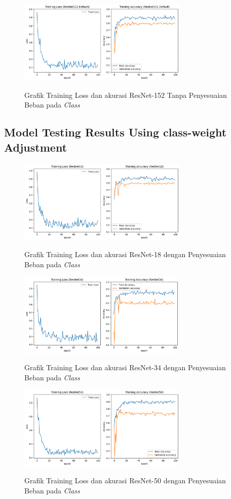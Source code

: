 \begin{figure}[hbtp]
	{\includegraphics[height=4cm]{gambar/TrainingGraphResNet152.png}}
	\caption{Grafik Training Loss dan akurasi ResNet-152 Tanpa Penyesuaian Beban pada \emph{Class}}
	\label{Fig:GraphTrainingDefPt5}
\end{figure}

\subsection{Model Testing Results Using class-weight Adjustment}
\label{sec:412}
\begin{figure}[hbtp]
	\centering
	{\includegraphics[height=4cm]{gambar/TrainingGraphResNet18class-weighted.png}}
	\caption{Grafik Training Loss dan akurasi ResNet-18 dengan Penyesuaian Beban pada \emph{Class}}
	\label{fig:graphTrainingWeightedPt1}
\end{figure}
\begin{figure}[hbtp]
	{\includegraphics[height=4cm]{gambar/TrainingGraphResNet34class-weighted.png}}
	\caption{Grafik Training Loss dan akurasi ResNet-34 dengan Penyesuaian Beban pada \emph{Class}}
	\label{fig:graphTrainingWeightedPt2}
\end{figure}
\begin{figure}[hbtp]
	\centering
	{\includegraphics[height=4cm]{gambar/TrainingGraphResNet50class-weighted.png}}
	\caption{Grafik Training Loss dan akurasi ResNet-50 dengan Penyesuaian Beban pada \emph{Class}}
	\label{fig:graphTrainingWeightedPt3}
\end{figure}

